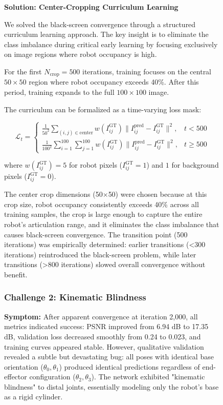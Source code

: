 \documentclass[12pt,a4paper,oneside]{report}
\begin{document}
\begin{figure}[H]
\textbf{Solution: Center-Cropping Curriculum Learning}

We solved the black-screen convergence through a structured curriculum learning approach. The key insight is to eliminate the class imbalance during critical early learning by focusing exclusively on image regions where robot occupancy is high.

For the first $N_{\text{crop}} = 500$ iterations, training focuses on the central $50 \times 50$ region where robot occupancy exceeds 40\%. After this period, training expands to the full $100 \times 100$ image.

The curriculum can be formalized as a time-varying loss mask:

\begin{equation}
\mathcal{L}_t = \begin{cases}
\frac{1}{50^2} \sum_{(i,j) \in \text{center}} w(I_{ij}^{\text{GT}}) \|I_{ij}^{\text{pred}} - I_{ij}^{\text{GT}}\|^2, & t < 500 \\
\frac{1}{100^2} \sum_{i=1}^{100}\sum_{j=1}^{100} w(I_{ij}^{\text{GT}}) \|I_{ij}^{\text{pred}} - I_{ij}^{\text{GT}}\|^2, & t \geq 500
\end{cases}
\end{equation}

where $w(I_{ij}^{\text{GT}}) = 5$ for robot pixels ($I_{ij}^{\text{GT}} = 1$) and $1$ for background pixels ($I_{ij}^{\text{GT}} = 0$).

The center crop dimensions (50$\times$50) were chosen because at this crop size, robot occupancy consistently exceeds 40\% across all training samples, the crop is large enough to capture the entire robot's articulation range, and it eliminates the class imbalance that causes black-screen convergence. The transition point (500 iterations) was empirically determined: earlier transitions (<300 iterations) reintroduced the black-screen problem, while later transitions (>800 iterations) slowed overall convergence without benefit.

\subsubsection{Challenge 2: Kinematic Blindness}

\textbf{Symptom:} After apparent convergence at iteration 2,000, all metrics indicated success: PSNR improved from 6.94 dB to 17.35 dB, validation loss decreased smoothly from 0.24 to 0.023, and training curves appeared stable. However, qualitative validation revealed a subtle but devastating bug: all poses with identical base orientation ($\theta_0, \theta_1$) produced identical predictions regardless of end-effector configuration ($\theta_2, \theta_3$). The network exhibited "kinematic blindness" to distal joints, essentially modeling only the robot's base as a rigid cylinder.


\end{figure}
\end{document}
